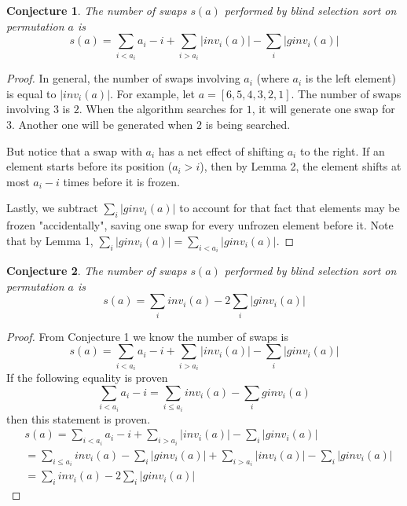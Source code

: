 \documentclass{article}
\newtheorem{conjecture}{Conjecture}
\begin{document}
\begin{conjecture}
    The number of swaps $s(a)$ performed by blind selection sort on permutation $a$ is
    \begin{equation}
        s(a) = \sum_{i < a_i} a_i - i + \sum_{i > a_i} \vert inv_i(a) \vert - \sum_{i} \vert ginv_i(a) \vert
    \end{equation}
\end{conjecture}
\begin{proof}
    In general, the number of swaps involving $a_i$ (where $a_i$ is the left element) is equal to $ \vert inv_i(a) \vert $.
For example, let $a = [6, 5, 4, 3, 2, 1]$. The number of swaps involving $3$ is $2$.
When the algorithm searches for $1$, it will generate one swap for $3$. Another one will be generated
when $2$ is being searched.

    But notice that a swap with $a_i$ has a net effect
of shifting $a_i$ to the right. If an element starts before its position ($a_i > i$), then by Lemma 2, the element shifts
at most $a_i - i$ times before it is frozen.

    Lastly, we subtract $ \sum_{i} \vert ginv_i(a) \vert$ to account
    for that fact that elements may be frozen
    "accidentally", saving one swap for every unfrozen element before it. Note that by Lemma 1,
    $ \sum_{i} \vert ginv_i(a) \vert = \sum_{i < a_i} \vert ginv_i(a) \vert $.
\end{proof}

\begin{conjecture}
    The number of swaps $s(a)$ performed by blind selection sort on permutation $a$ is
    \begin{equation}
        s(a) = \sum_{i} inv_i(a) - 2 \sum_{i} \vert ginv_i(a) \vert
    \end{equation}
\end{conjecture}
\begin{proof}
    From Conjecture  1 we know the number of swaps is
    \begin{equation}
        s(a) = \sum_{i < a_i} a_i - i + \sum_{i > a_i} \vert inv_i(a) \vert - \sum_{i} \vert ginv_i(a) \vert
    \end{equation}
    If the following equality is proven
    \begin{equation}
        \sum_{i < a_i} a_i - i = \sum_{i \leq a_i} inv_i(a) - \sum_{i} ginv_i(a)
    \end{equation}
    then this statement is proven.
    \begin{align}
        &s(a) = \sum_{i < a_i} a_i - i + \sum_{i > a_i} \vert inv_i(a) \vert - \sum_{i} \vert ginv_i(a) \vert \\\nonumber
        &= \sum_{i \leq a_i} inv_i(a) - \sum_{i} \vert ginv_i(a) \vert + \sum_{i > a_i} \vert inv_i(a) \vert - \sum_{i} \vert ginv_i(a) \vert \\\nonumber
        &= \sum_{i} inv_i(a) - 2 \sum_{i} \vert ginv_i(a) \vert
    \end{align}
\end{proof}
\end{document}
